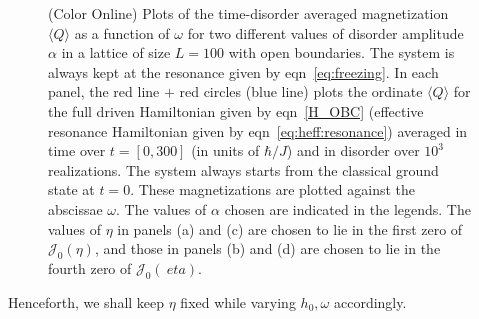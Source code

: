 \documentclass[a4paper,10pt]{article}
\begin{document}
\begin{figure}
\caption{(Color Online) Plots of the time-disorder averaged magnetization $\langle Q \rangle$ as a function of $\omega$ for two different values of disorder amplitude $\alpha$ in a lattice of size $L=100$ with open boundaries. The system is always kept at the resonance given by eqn~\ref{eq:freezing}. In each panel, the red line $+$ red circles  (blue line) plots the ordinate $\langle Q \rangle$ for the full driven Hamiltonian given by eqn~\ref{H_OBC} (effective resonance Hamiltonian given by eqn~\ref{eq:heff:resonance}) averaged in time over $t=\left[0,300\right]$ (in units of $\hbar/J$) and in disorder over $10^3$ realizations. The system always starts from the classical ground state at $t=0$. These magnetizations are plotted against the abscissae $\omega$. The values of $\alpha$ chosen are indicated in the legends. The values of $\eta$ in panels (a) and (c) are chosen to lie in the first zero of $\mathcal{J}_0(\eta)$, and those in panels (b) and (d) are chosen to lie in the fourth zero of $\mathcal{J}_0(\
eta)$.}
\label{fig:multh0:qcomp}
\end{figure}
Henceforth, we shall keep $\eta$ fixed while varying $h_0 ,\omega$ accordingly. 
\end{document}
